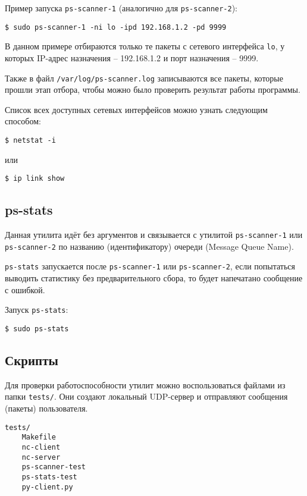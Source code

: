 \newpage

Пример запуска \verb|ps-scanner-1| (аналогично для \verb|ps-scanner-2|):
\begin{lstlisting}
$ sudo ps-scanner-1 -ni lo -ipd 192.168.1.2 -pd 9999
\end{lstlisting}
В данном примере отбираются только те пакеты с сетевого интерфейса \verb|lo|, у которых IP-адрес назначения -- 192.168.1.2 и порт назначения -- 9999.

\linespace

Также в файл \verb|/var/log/ps-scanner.log| записываются все пакеты, которые прошли этап отбора, чтобы можно было проверить результат работы программы.

\linespace

Список всех доступных сетевых интерфейсов можно узнать следующим способом:
\begin{lstlisting}
$ netstat -i
\end{lstlisting}
или
\begin{lstlisting}
$ ip link show
\end{lstlisting}

\subsection{ps-stats}

Данная утилита идёт без аргументов и связывается с утилитой \verb|ps-scanner-1| или \verb|ps-scanner-2| по названию (идентификатору) очереди (Message Queue Name).

\verb|ps-stats| запускается после \verb|ps-scanner-1| или \verb|ps-scanner-2|, если попытаться выводить статистику без предварительного сбора, то будет напечатано сообщение с ошибкой.

\linespace

Запуск \verb|ps-stats|:
\begin{lstlisting}
$ sudo ps-stats
\end{lstlisting}

\newpage

\subsection{Скрипты}

Для проверки работоспособности утилит можно воспользоваться файлами из папки \verb|tests/|. Они создают локальный UDP-сервер и отправляют сообщения (пакеты) пользователя.

\begin{lstlisting}
tests/
    Makefile
    nc-client
    nc-server
    ps-scanner-test
    ps-stats-test
    py-client.py
\end{lstlisting}

